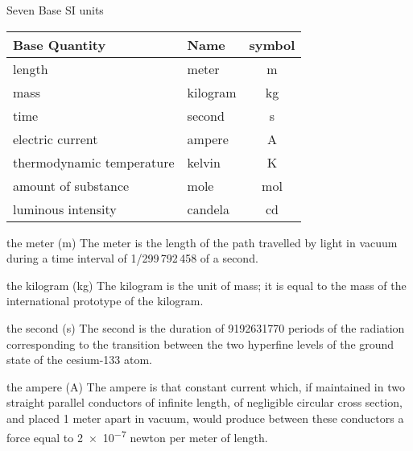 \documentclass[avery5371,grid]{flashcards}
\begin{document}
\begin{flashcard}[Defintion]{Seven Base SI units}
\vfill
\begin{center}
\begin{tabular}{llc}
    Base Quantity & Name & symbol \\
    \midrule
    length  & meter     & m \\
    mass    & kilogram  & kg \\
    time    & second    & s \\
    electric current            & ampere    & A \\
    thermodynamic temperature   & kelvin    & K \\
    amount of substance         & mole      & mol \\
    luminous intensity          & candela   & cd \\
    \bottomrule
\end{tabular}
\end{center}
\vfill
\end{flashcard}

\begin{flashcard}[Defintion]{the meter (m)}
\vspace{\fill}
The meter is the length of the path travelled by light in vacuum during a time interval of 1/299\,792\,458 of a second.
\vspace{\fill}
\end{flashcard}

\begin{flashcard}[Defintion]{the kilogram (kg)}
\vspace{\fill}
The kilogram is the unit of mass; it is equal to the mass of the international prototype of the kilogram.
\vspace{\fill}
\end{flashcard}

\begin{flashcard}[Defintion]{the second (s)}
\vspace{\fill}
The second is the duration of \num{9 192 631 770} periods of the radiation corresponding to the transition between the two hyperfine levels of the ground state of the cesium-133 atom.
\vspace{\fill}
\end{flashcard}

\begin{flashcard}[Defintion]{the ampere (A)}
\vspace{\fill}
The ampere is that constant current which, if maintained in two straight parallel conductors of infinite length, of negligible circular cross section, and placed 1 meter apart in vacuum, would produce between these conductors a force equal to \num{2e-7} newton per meter of length.
\vspace{\fill}
\end{flashcard}
\end{document}

